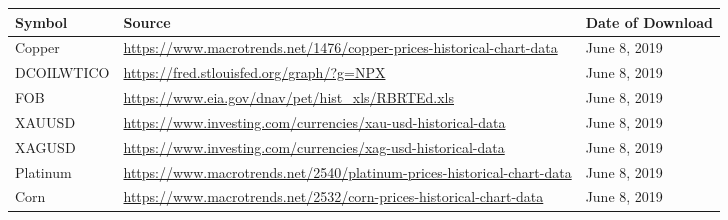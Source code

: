 \documentclass[11pt, a4paper]{article}
\begin{document}
        \begin{table}[H]
    \centering
        \begin{tabular}{p{3.0cm} p{10.0cm}l}
        \hline
        \textbf{Symbol}                                                             & \textbf{Source}                                                                                                                                              & \textbf{Date of Download} \\ \hline
        
       Copper                                                                      & \url{https://www.macrotrends.net/1476/copper-prices-historical-chart-data}                                                                  & June 8, 2019              \\
        DCOILWTICO                                                                  & \url{https://fred.stlouisfed.org/graph/?g=NPX}                                                                                              & June 8, 2019              \\
        FOB                                                                         & \url{https://www.eia.gov/dnav/pet/hist\_xls/RBRTEd.xls}                                                                                     & June 8, 2019              \\
        XAUUSD                                                                      & \url{https://www.investing.com/currencies/xau-usd-historical-data}                                                                          & June 8, 2019              \\
        XAGUSD                                                                      & \url{https://www.investing.com/currencies/xag-usd-historical-data}                                                                          & June 8, 2019              \\
        Platinum                                                                    & \url{https://www.macrotrends.net/2540/platinum-prices-historical-chart-data}                                                                & June 8, 2019              \\
        Corn                                                                        & \url{https://www.macrotrends.net/2532/corn-prices-historical-chart-data}                                                                    & June 8, 2019              \\

\end{tabular}
\end{table}
\end{document}

